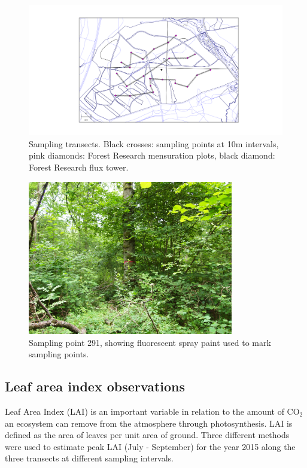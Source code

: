 \begin{figure}[ht]
    \centering
    \includegraphics[width=\textwidth]{chapter/chapter4/straitsmap_threet_10m.png}
    \caption{Sampling transects. Black crosses: sampling points at 10m intervals, pink diamonds: Forest Research mensuration plots, black diamond: Forest Research flux tower.} \label{chap4:fig:transects}
\end{figure}

\begin{figure}[ht]
    \centering
    \includegraphics[width=0.8\textwidth]{chapter/chapter4/291E.jpg}
    \caption{Sampling point 291, showing fluorescent spray paint used to mark sampling points.} \label{chap4:fig:pink_tree}
\end{figure}

\subsection{Leaf area index observations}

Leaf Area Index (LAI) is an important variable in relation to the amount of CO\(_2\) an ecosystem can remove from the atmosphere through photosynthesis. LAI is defined as the area of leaves per unit area of ground. Three different methods were used to estimate peak LAI (July - September) for the year 2015 along the three transects at different sampling intervals.

